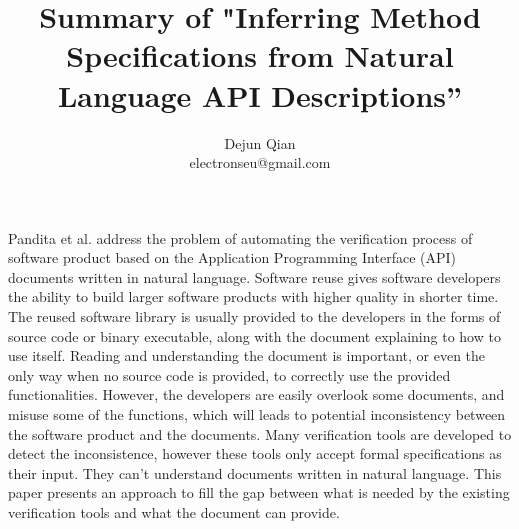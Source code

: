 \documentclass[11pt,letterpaper,oneside]{article}
\title{Summary of "Inferring Method Specifications from Natural Language API Descriptions''}
\author{Dejun Qian\\electronseu@gmail.com}
\date{}
\begin{document}
\maketitle

Pandita et al. \cite{bib:Pandita} address the problem of automating the verification process of software product based on the Application Programming Interface (API) documents written in natural language.
Software reuse gives software developers the ability to build larger software products with higher quality in shorter time.
The reused software library is usually provided to the developers in the forms of source code or binary executable,
along with the document explaining to how to use itself.
Reading and understanding the document is important, 
or even the only way when no source code is provided,
to correctly use the provided functionalities.
However, the developers are easily overlook some documents,
and misuse some of the functions,
which will leads to potential inconsistency between the software product and the documents.
Many verification tools are developed to detect the inconsistence,
however these tools only accept formal specifications as their input.
They can't understand documents written in natural language.
This paper presents an approach to fill the gap between what is needed by the existing verification tools and what the document can provide.
\end{document}
